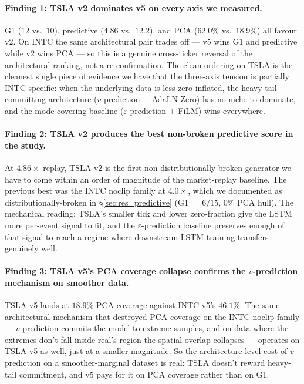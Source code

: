\documentclass[journal]{IEEEtran}
\newcommand{\eps}{\varepsilon}
\theoremstyle{definition}   %
\begin{document}
\paragraph{Finding 1: TSLA v2 dominates v5 on every axis we measured.}
G1 ($12$ vs.\ $10$), predictive ($4.86$ vs.\ $12.2$), and PCA
($62.0\%$ vs.\ $18.9\%$) all favour v2. On INTC the same
architectural pair trades off --- v5 wins G1 and predictive while
v2 wins PCA --- so this is a genuine cross-ticker reversal of the
architectural ranking, not a re-confirmation. The clean ordering on
TSLA is the cleanest single piece of evidence we have that the
three-axis tension is partially INTC-specific: when the underlying
data is less zero-inflated, the heavy-tail-committing architecture
($v$-prediction + AdaLN-Zero) has no niche to dominate, and the
mode-covering baseline ($\eps$-prediction + FiLM) wins everywhere.

\paragraph{Finding 2: TSLA v2 produces the best non-broken predictive score in the study.}
At $4.86\times$ replay, TSLA v2 is the first non-distributionally-broken
generator we have to come within an order of magnitude of the
market-replay baseline. The previous best was the INTC noclip family
at $4.0\times$, which we documented as distributionally-broken in
\S\ref{sec:res_predictive} (G1 $= 6/15$, $0\%$ PCA hull). The
mechanical reading: TSLA's smaller tick and lower zero-fraction give
the LSTM more per-event signal to fit, and the $\eps$-prediction
baseline preserves enough of that signal to reach a regime where
downstream LSTM training transfers genuinely well.

\paragraph{Finding 3: TSLA v5's PCA coverage collapse confirms the $v$-prediction mechanism on smoother data.}
TSLA v5 lands at $18.9\%$ PCA coverage against INTC v5's
$46.1\%$. The same architectural mechanism that destroyed PCA
coverage on the INTC noclip family --- $v$-prediction commits the
model to extreme samples, and on data where the extremes don't fall
inside real's region the spatial overlap collapses --- operates on
TSLA v5 as well, just at a smaller magnitude. So the architecture-level
cost of $v$-prediction on a smoother-marginal dataset is real:
TSLA doesn't reward heavy-tail commitment, and v5 pays for it on
PCA coverage rather than on G1.
\end{document}
